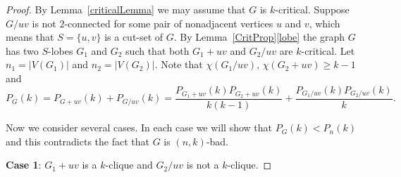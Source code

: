 \documentclass[11pt]{article}
\theoremstyle{plain}
\theoremstyle{definition}
\theoremstyle{remark}
\begin{document}
\begin{proof}
By Lemma~\ref{criticalLemma} we may assume that $G$ is $k$-critical.
Suppose $G/uv$ is not $2$-connected for some pair of nonadjacent vertices $u$ and $v$, which means that $S=\{u,v\}$ is a cut-set of $G$. By Lemma~\ref{CritProp}\ref{lobe} the graph $G$ has two $S$-lobes $G_1$ and $G_2$ such that both $G_1+uv$ and   $G_2/uv$ are $k$-critical.  Let $n_1=|V(G_1)|$ and $n_2=|V(G_2)|$. Note that $\chi (G_1/uv), \, \chi(G_2+uv)\geq k-1$ and
\[
P_G(k)= P_{G+uv}(k)+P_{G/uv}(k)= \frac{P_{G_1+uv}(k)P_{G_2+uv}(k)}{k(k-1)}+\frac{P_{G_1/uv}(k)P_{G_2/uv}(k)}{k}.
\]

Now we consider several cases. In each case we will show that $P_G(k)<P_n(k)$  and this contradicts the fact that $G$ is $(n,k)$-bad.

\medskip

\textbf{Case 1}: $G_1+uv$ is a $k$-clique and $G_2/uv$ is not a $k$-clique.


\end{proof}
\end{document}
